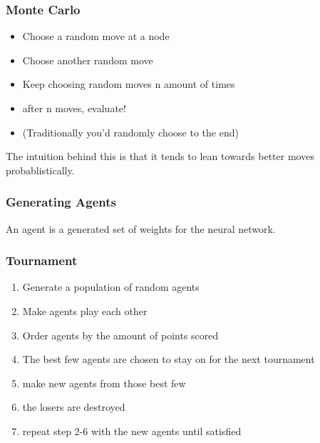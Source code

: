 \documentclass[aspectratio=169]{beamer}
\begin{document}
	\begin{frame}
		\frametitle{Monte Carlo}
		\begin{itemize}
			\item Choose a random move at a node
			\item Choose another random move
			\item Keep choosing random moves n amount of times
			\item after n moves, evaluate!
			\item (Traditionally you'd randomly choose to the end)
		\end{itemize}

		The intuition behind this is that it tends to lean towards better moves probablistically.
	\end{frame}

	\begin{frame}
		\frametitle{Generating Agents}
		An agent is a generated set of weights for the neural network.
	\end{frame}

	\begin{frame}
		\frametitle{Tournament}
		\begin{enumerate}
			\item Generate a population of random agents
			\item Make agents play each other
			\item Order agents by the amount of points scored
			\item The best few agents are chosen to stay on for the next tournament
			\item make new agents from those best few
			\item the losers are destroyed
			\item repeat step 2-6 with the new agents until satisfied
		\end{enumerate}
	\end{frame}

\end{document}
